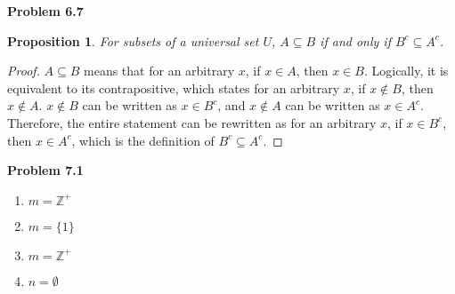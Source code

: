 \documentclass{article}
\newtheorem{prop}[thm]{Proposition}
\begin{document}
\textbf{Problem 6.7}
\begin{prop}
    For subsets of a universal set $U$, $A \subseteq B$ if and only if $B^c \subseteq A^c$.
\end{prop}
\begin{proof}
    $A \subseteq B$ means that for an arbitrary $x$, if $x \in A$, then $x \in B$. 
    Logically, it is equivalent to its contrapositive, which states for an arbitrary $x$, if $x \not \in B$, then $x \not \in A$.
    $x \not \in B$ can be written as $x \in B^c$, and $x \not \in A$ can be written as $x \in A^c$.
    Therefore, the entire statement can be rewritten as for an arbitrary $x$, if $x \in B^c$, then $x \in A^c$, which is the definition of $B^c \subseteq A^c$.
\end{proof}
\bigbreak

\textbf{Problem 7.1}
\begin{enumerate}[label={(\roman*)}]
    \item $m = \mathbb{Z^+}$
    \item $m = \{1\}$
    \item $m = \mathbb{Z^+}$
    \item $n = \emptyset$
\end{enumerate}
\bigbreak
\end{document}
